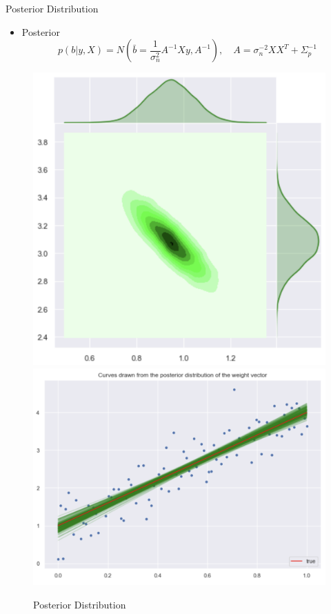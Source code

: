 \documentclass[10pt]{beamer}
\begin{document}
\begin{frame}{Posterior Distribution}
\begin{itemize}
\item Posterior 
$$
p(b|y, X) = N\left(\bar{b}=\frac{1}{\sigma_n^2}A^{-1}Xy, A^{-1}\right), \quad A=\sigma_{n}^{-2}XX^T + \Sigma_p^{-1}
$$
\end{itemize}
\begin{center}
\begin{figure}
\includegraphics[scale=0.17]{images/lin_join_posterior.png} 
\includegraphics[scale=0.17]{images/posterior_lin_mod_param_distr.png} 
\caption{Posterior Distribution}
\end{figure}
\end{center}
\end{frame}
\end{document}
